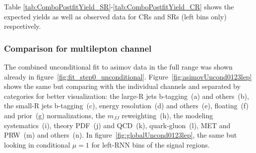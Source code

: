 \renewcommand{\fitplotlocation}{./figures/StatisticalInterpretation/left/postfit/}

Table \ref{tab:ComboPostfitYield_SR}-\ref{tab:ComboPostfitYield_CR}
shows the expected yields as well as observed data for CRs and SRs (left bins only) respcetively.




\subsubsection{Comparison for multilepton channel}

The combined unconditional fit to asimov data in the full range was shown already in figure~\ref{fig:fit_step0_unconditional}. Figure~\ref{fig:asimovUncond0123lep} shows the same but comparing with the individual channels and separated by categories for better visualization: the large-R jets b-tagging~(a) and others~(b), the small-R jets b-tagging~(c), energy resolution~(d) and others~(e), floating~(f) and prior~(g) normalizations, the $m_{JJ}$ reweighting~(h), the modeling systematics~(i), theory PDF~(j) and QCD~(k), quark-gluon~(l), MET and PRW~(m) and others~(n). In figure~\ref{fig:globalUncond0123lep}, the same but looking in conditional $\mu=1$ for left-RNN bins of the signal regions.


